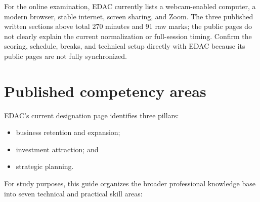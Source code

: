 \documentclass[11pt,letterpaper,oneside,openany]{book}
\begin{document}
For the online examination, EDAC currently lists a webcam-enabled computer, a modern browser, stable internet, screen sharing, and Zoom. The three published written sections above total 270 minutes and 91 raw marks; the public pages do not clearly explain the current normalization or full-session timing. Confirm the scoring, schedule, breaks, and technical setup directly with EDAC because its public pages are not fully synchronized.


\section[Published competency areas]{Published competency areas}
EDAC's current designation page identifies three pillars:


\begin{itemize}
\item business retention and expansion;
\item investment attraction; and
\item strategic planning.
\end{itemize}


For study purposes, this guide organizes the broader professional knowledge base into seven technical and practical skill areas:
\end{document}
